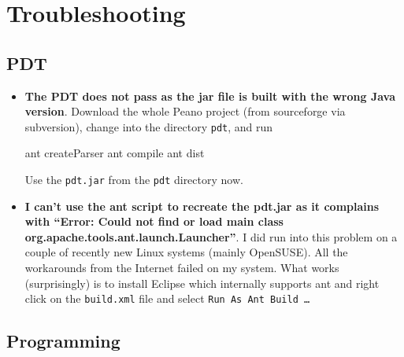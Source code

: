 \chapter{Troubleshooting}

\section{PDT}

\begin{itemize}
  \item {\bf The PDT does not pass as the jar file is built with the wrong Java
  version}. Download the whole Peano project (from sourceforge via subversion),
  change into the directory \texttt{pdt}, and run
  \begin{code}
  ant createParser
  ant compile
  ant dist
  \end{code}
  Use the \texttt{pdt.jar} from the \texttt{pdt} directory now. 
  \item {\bf I can't use the ant script to recreate the pdt.jar as it complains
  with ``Error: Could not find or load main class
  org.apache.tools.ant.launch.Launcher''}. I did run into this problem on a
  couple of recently new Linux systems (mainly OpenSUSE). All the workarounds
  from the Internet failed on my system. What works (surprisingly) is to install
  Eclipse which internally supports ant and right click on the
  \texttt{build.xml} file and select \texttt{Run As Ant Build \ldots}
\end{itemize}





\section{Programming}

